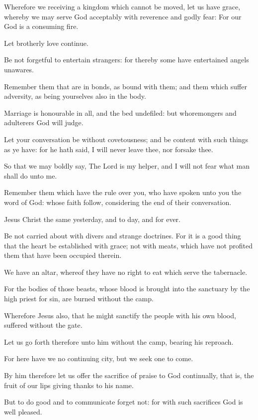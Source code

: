 \Verse Wherefore we receiving a kingdom which cannot be moved, let us have grace, whereby we may serve God acceptably with reverence and godly fear: \Verse For our God is a consuming fire.


\Chapter
\Verse Let brotherly love continue.

\Verse Be not forgetful to entertain strangers: for thereby some have entertained angels unawares.

\Verse Remember them that are in bonds, as bound with them; and them which suffer adversity, as being yourselves also in the body.

\Verse Marriage is honourable in all, and the bed undefiled: but whoremongers and adulterers God will judge.

\Verse Let your conversation be without covetousness; and be content with such things as ye have: for he hath said, I will never leave thee, nor forsake thee.

\Verse So that we may boldly say, The Lord is my helper, and I will not fear what man shall do unto me.

\Verse Remember them which have the rule over you, who have spoken unto you the word of God: whose faith follow, considering the end of their conversation.

\Verse Jesus Christ the same yesterday, and to day, and for ever.

\Verse Be not carried about with divers and strange doctrines. For it is a good thing that the heart be established with grace; not with meats, which have not profited them that have been occupied therein.

\Verse We have an altar, whereof they have no right to eat which serve the tabernacle.

\Verse For the bodies of those beasts, whose blood is brought into the sanctuary by the high priest for sin, are burned without the camp.

\Verse Wherefore Jesus also, that he might sanctify the people with his own blood, suffered without the gate.

\Verse Let us go forth therefore unto him without the camp, bearing his reproach.

\Verse For here have we no continuing city, but we seek one to come.

\Verse By him therefore let us offer the sacrifice of praise to God continually, that is, the fruit of our lips giving thanks to his name.

\Verse But to do good and to communicate forget not: for with such sacrifices God is well pleased.

